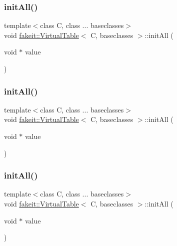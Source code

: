 \subsubsection{\texorpdfstring{initAll()}{initAll()}\hspace{0.1cm}{\footnotesize\ttfamily [7/10]}}
{\footnotesize\ttfamily template$<$class C, class ... baseclasses$>$ \\
void \mbox{\hyperlink{structfakeit_1_1VirtualTable}{fakeit\+::\+Virtual\+Table}}$<$ C, baseclasses $>$\+::init\+All (\begin{DoxyParamCaption}\item[{void $\ast$}]{value }\end{DoxyParamCaption})\hspace{0.3cm}{\ttfamily [inline]}}

\mbox{\label{structfakeit_1_1VirtualTable_a261b66b33067b4425791762cb3786f20}} 
\subsubsection{\texorpdfstring{initAll()}{initAll()}\hspace{0.1cm}{\footnotesize\ttfamily [8/10]}}
{\footnotesize\ttfamily template$<$class C, class ... baseclasses$>$ \\
void \mbox{\hyperlink{structfakeit_1_1VirtualTable}{fakeit\+::\+Virtual\+Table}}$<$ C, baseclasses $>$\+::init\+All (\begin{DoxyParamCaption}\item[{void $\ast$}]{value }\end{DoxyParamCaption})\hspace{0.3cm}{\ttfamily [inline]}}

\mbox{\label{structfakeit_1_1VirtualTable_a261b66b33067b4425791762cb3786f20}} 
\subsubsection{\texorpdfstring{initAll()}{initAll()}\hspace{0.1cm}{\footnotesize\ttfamily [9/10]}}
{\footnotesize\ttfamily template$<$class C, class ... baseclasses$>$ \\
void \mbox{\hyperlink{structfakeit_1_1VirtualTable}{fakeit\+::\+Virtual\+Table}}$<$ C, baseclasses $>$\+::init\+All (\begin{DoxyParamCaption}\item[{void $\ast$}]{value }\end{DoxyParamCaption})\hspace{0.3cm}{\ttfamily [inline]}}

